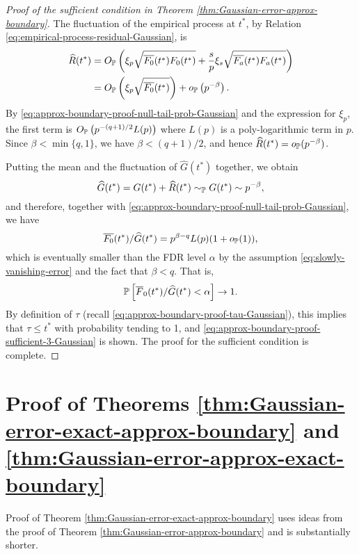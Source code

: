 \begin{proof}[Proof of the sufficient condition in Theorem \ref{thm:Gaussian-error-approx-boundary}]
The fluctuation of the empirical process at $t^*$, by Relation \eqref{eq:empirical-process-residual-Gaussian}, is 
\begin{align*}
    \widehat{R}(t^*) 
    &= O_\P\left(\xi_p\sqrt{\overline{F_0}(t^*)F_0(t^*)} + \frac{s}{p}\xi_s\sqrt{\overline{F_a}(t^*)F_a(t^*)}\right)\\
    &= O_\P\left(\xi_p\sqrt{\overline{F_0}(t^*)}\right) + o_\P\left(p^{-\beta}\right).
\end{align*}
By \eqref{eq:approx-boundary-proof-null-tail-prob-Gaussian} and the expression for $\xi_p$, the first term is $O_\P\left(p^{-(q+1)/2}L(p)\right)$ where $L(p)$ is a poly-logarithmic term in $p$.
Since $\beta<\min\{q,1\}$, we have $\beta<(q+1)/2$, and hence $\widehat{R}(t^*) = o_\P(p^{-\beta})$.

Putting the mean and the fluctuation of $\widehat{G}(t^*)$ together, we obtain
$$
\widehat{G}(t^*) = G(t^*) + \widehat{R}(t^*) \sim_\P G(t^*) \sim p^{-\beta},
$$
and therefore, together with \eqref{eq:approx-boundary-proof-null-tail-prob-Gaussian}, we have
$$
\overline{F_0}(t^*)/\widehat{G}(t^*) = p^{\beta-q}L(p)(1+o_{\P}(1)),
$$
which is eventually smaller than the FDR level $\alpha$ by the assumption \eqref{eq:slowly-vanishing-error} and the fact that $\beta<q$.
That is, 
$$
\P\left[\overline{F}_0(t^*) / \widehat{G}(t^*) < \alpha\right] \to 1.
$$
By definition of $\tau$ (recall \eqref{eq:approx-boundary-proof-tau-Gaussian}), this implies that $\tau \le t^*$ with probability tending to 1, and \eqref{eq:approx-boundary-proof-sufficient-3-Gaussian} is shown.
The proof for the sufficient condition is complete.
\end{proof}










\section{Proof of Theorems \ref{thm:Gaussian-error-exact-approx-boundary} and \ref{thm:Gaussian-error-approx-exact-boundary}}
\label{subsec:proof-additive-error-mix-boundaries}


Proof of Theorem \ref{thm:Gaussian-error-exact-approx-boundary} uses ideas from the proof of Theorem \ref{thm:Gaussian-error-approx-boundary} and is substantially shorter.


